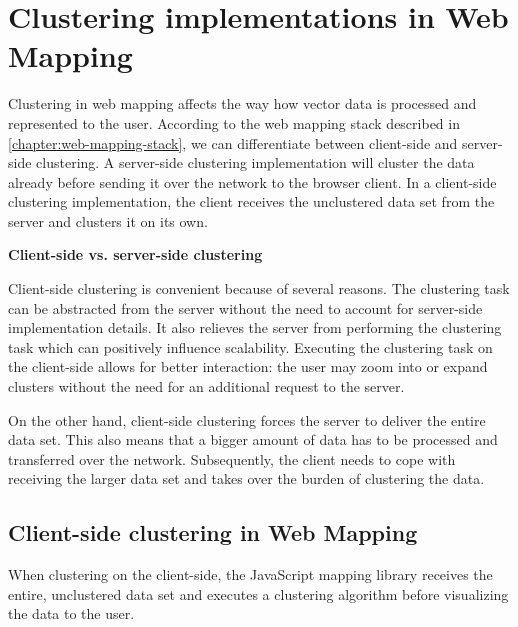 
%
%

\section{Clustering implementations in Web Mapping}

Clustering in web mapping affects the way how vector data is processed and represented to the user.  According to the web mapping stack described in \ref{chapter:web-mapping-stack}, we can differentiate between client-side and server-side clustering. A server-side clustering implementation will cluster the data already before sending it over the network to the browser client. In a client-side clustering implementation, the client receives the unclustered data set from the server and clusters it on its own.

\textbf{Client-side vs. server-side clustering}

Client-side clustering is convenient because of several reasons. The clustering task can be abstracted from the server without the need to account for server-side implementation details. It also relieves the server from performing the clustering task which can positively influence scalability. Executing the clustering task on the client-side allows for better interaction: the user may zoom into or expand clusters without the need for an additional request to the server. 

On the other hand, client-side clustering forces the server to deliver the entire data set. This also means that a bigger amount of data has to be processed and transferred over the network. Subsequently, the client needs to cope with receiving the larger data set and takes over the burden of clustering the data.

\subsection{Client-side clustering in Web Mapping}
\label{chapter:client-side-web-mapping}

When clustering on the client-side, the JavaScript mapping library receives the entire, unclustered data set and executes a clustering algorithm before visualizing the data to the user.

